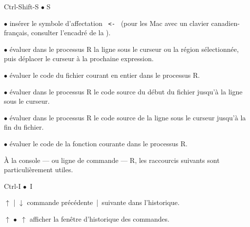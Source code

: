 \begin{ttscript}{Ctrl-Shift-S $\bullet$ \cmdkey\shiftkey S}
\item[\code{Alt+-} $\bullet$ \code{\optkey\,-}] insérer le symbole
  d'affectation \verb*| <- | (pour les Mac avec un clavier
  canadien-français, consulter l'encadré de la
  ).
\item[\code{Ctrl+Retour} $\bullet$ \code{\cmdkey\,\returnkey}]
  évaluer dans le processus R la ligne sous le curseur ou la région
  sélectionnée, puis déplacer le curseur à la prochaine expression.
\item[\code{Ctrl+Shift+S} $\bullet$ \code{\shiftkey\,\cmdkey\,S}]
  évaluer le code du fichier courant en entier dans le processus R.
\item[\code{Ctrl+Alt+B} $\bullet$ \code{\optkey\,\cmdkey\,B}]
  évaluer dans le processus R le code source du début du fichier
  jusqu'à la ligne sous le curseur.
\item[\code{Ctrl+Alt+E} $\bullet$ \code{\optkey\,\cmdkey\,E}]
  évaluer dans le processus R le code source de la ligne sous le curseur
  jusqu'à la fin du fichier.
\item[\code{Ctrl+Alt+F} $\bullet$ \code{\optkey\,\cmdkey\,F}]
  évaluer le code de la fonction courante dans le processus R.
\end{ttscript}

À la console --- ou ligne de commande --- R, les raccourcis suivants
sont particulièrement utiles.
\begin{ttscript}{Ctrl-I $\bullet$ \cmdkey\,I}
\item[$\uparrow$ | $\downarrow$] commande
  précédente~|~suivante dans l'historique.
\item[\code{Ctrl+}$\uparrow$ $\bullet$ \cmdkey\,$\uparrow$] afficher
  la fenêtre d'historique des commandes.
\end{ttscript}


